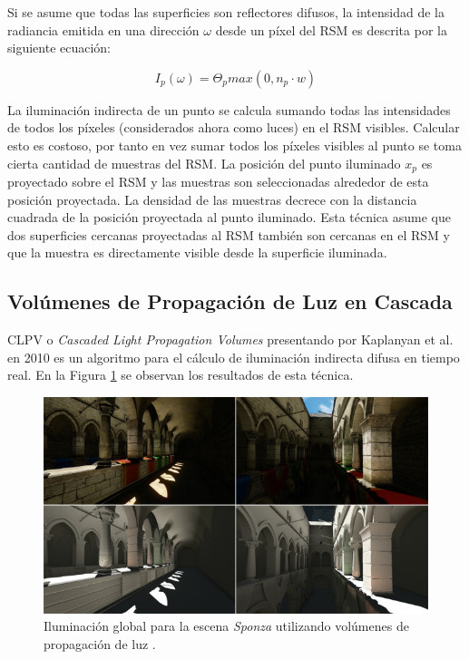 Si se asume que todas las superficies son reflectores difusos, la intensidad de la radiancia emitida en una dirección $\omega$ desde un píxel del \ac{RSM} es descrita por la siguiente ecuación:

\begin{equation}
    I_{p}(\omega) = \Theta_{p}max(0, n_{p} \cdot {w})
    \label{eq:rsm_radiance}
\end{equation}

La iluminación indirecta de un punto se calcula sumando todas las intensidades de todos los píxeles (considerados ahora como luces) en el \ac{RSM} visibles. Calcular esto es costoso, por tanto en vez sumar todos los píxeles visibles al punto se toma cierta cantidad de muestras del \ac{RSM}. La posición del punto iluminado $x_{p}$ es proyectado sobre el \ac{RSM} y las muestras son seleccionadas alrededor de esta posición proyectada. La densidad de las muestras decrece con la distancia cuadrada de la posición proyectada al punto iluminado. Esta técnica asume que dos superficies cercanas proyectadas al \ac{RSM} también son cercanas en el \ac{RSM} y que la muestra es directamente visible desde la superficie iluminada.

\subsection{Volúmenes de Propagación de Luz en Cascada}
\label{sub:clpv}
\Ac{CLPV} o \emph{Cascaded Light Propagation Volumes} presentando por Kaplanyan et al. en 2010 \cite{Kaplanyan:2010} es un algoritmo para el cálculo de iluminación indirecta difusa en tiempo real. En la Figura \ref{fig:lvp_results} se observan los resultados de esta técnica.

\begin{figure}[H]
	\centering
	\includegraphics[width=0.85\linewidth]{media/lpvresult.png}
	\caption{Iluminación global para la escena \emph{Sponza} utilizando volúmenes de propagación de luz \cite{Kaplanyan:2010}.}
	\label{fig:lvp_results}
\end{figure}

